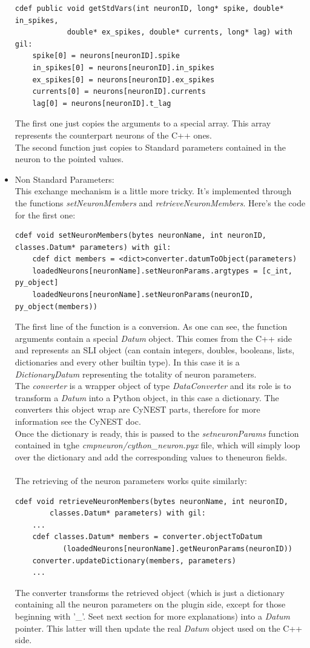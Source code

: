 \documentclass{article}
\begin{document}
\begin{itemize}
\begin{verbatim}
cdef public void getStdVars(int neuronID, long* spike, double* in_spikes, 
            double* ex_spikes, double* currents, long* lag) with gil:
    spike[0] = neurons[neuronID].spike
    in_spikes[0] = neurons[neuronID].in_spikes
    ex_spikes[0] = neurons[neuronID].ex_spikes
    currents[0] = neurons[neuronID].currents
    lag[0] = neurons[neuronID].t_lag
\end{verbatim}
The first one just copies the arguments to a special array. This array represents the counterpart neurons of the C++ ones.\\
The second function just copies to Standard parameters contained in the neuron to the pointed values.
\item Non Standard Parameters:\\
This exchange mechanism is a little more tricky. It's implemented through the functions \emph{setNeuronMembers} and \emph{retrieveNeuronMembers}. Here's the code for the first one:
\begin{verbatim}
cdef void setNeuronMembers(bytes neuronName, int neuronID, classes.Datum* parameters) with gil:
    cdef dict members = <dict>converter.datumToObject(parameters)
    loadedNeurons[neuronName].setNeuronParams.argtypes = [c_int, py_object]
    loadedNeurons[neuronName].setNeuronParams(neuronID, py_object(members))
\end{verbatim}
The first line of the function is a conversion. As one can see, the function arguments contain a special \emph{Datum} object. This comes from the C++ side and represents an SLI object (can contain integers, doubles, booleans, lists, dictionaries and every other builtin type). In this case it is a \emph{DictionaryDatum} representing the totality of neuron parameters.\\
The \emph{converter} is a wrapper object of type \emph{DataConverter} and its role is to transform a \emph{Datum} into a Python object, in this case a dictionary. The converters this object wrap are CyNEST parts, therefore for more information see the CyNEST doc.\\
Once the dictionary is ready, this is passed to the \emph{setneuronParams} function contained in tghe \emph{cmpneuron/cython\_neuron.pyx} file, which will simply loop over the dictionary and add the corresponding values to theneuron fields.\\ \\


The retrieving of the neuron parameters works quite similarly:
\begin{verbatim}
cdef void retrieveNeuronMembers(bytes neuronName, int neuronID, 
        classes.Datum* parameters) with gil:
    ...
    cdef classes.Datum* members = converter.objectToDatum
           (loadedNeurons[neuronName].getNeuronParams(neuronID))
    converter.updateDictionary(members, parameters)
    ...
\end{verbatim}
The converter transforms the retrieved object (which is just a dictionary containing all the neuron parameters on the plugin side, except for those beginning with '\_'. Seet next section for more explanations) into a \emph{Datum} pointer. This latter will then update the real \emph{Datum} object used on the C++ side.
\end{itemize}
\end{document}
